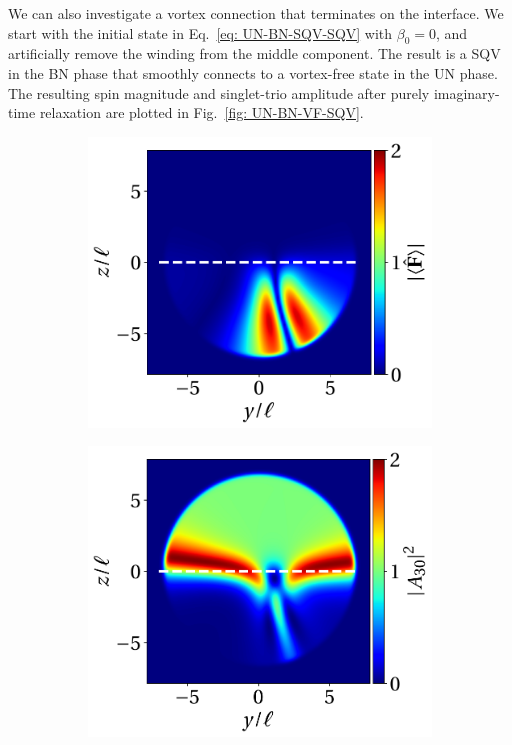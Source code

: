 We can also investigate a vortex connection that terminates on the interface.
We start with the initial state in Eq.~\eqref{eq: UN-BN-SQV-SQV} with
\(\beta_0=0\), and artificially remove the winding from the middle component.
The result is a SQV in the BN phase that smoothly connects to a vortex-free
state in the UN phase.
The resulting spin magnitude and singlet-trio amplitude after purely
imaginary-time relaxation are plotted in Fig.~\ref{fig: UN-BN-VF-SQV}.
\begin{figure}
    \centering
    \begin{subfigure}{0.45\textwidth}
        \includegraphics[width=\textwidth]
        {gfx/ch-spin2/UN-BN_VF-SQV_spin_mag.pdf}
        \caption{}
    \end{subfigure}
    \begin{subfigure}{0.45\textwidth}
        \includegraphics[width=\textwidth]{gfx/ch-spin2/UN-BN_VF-SQV_a30.pdf}

\end{subfigure}
\end{figure}
